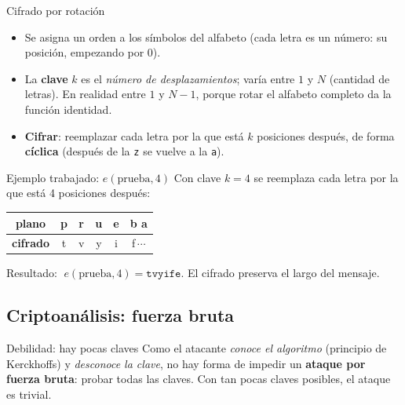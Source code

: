 \documentclass[11pt,a4paper]{article}
\begin{document}
\begin{defbox}{Cifrado por rotación}
\begin{itemize}[leftmargin=1.4em,itemsep=2pt]
  \item Se asigna un orden a los símbolos del alfabeto (cada letra es un número: su posición,
        empezando por 0).
  \item La \textbf{clave} $k$ es el \emph{número de desplazamientos}; varía entre $1$ y $N$
        (cantidad de letras). En realidad entre $1$ y $N-1$, porque rotar el alfabeto completo
        da la función identidad.
  \item \textbf{Cifrar}: reemplazar cada letra por la que está $k$ posiciones después, de
        forma \textbf{cíclica} (después de la \texttt{z} se vuelve a la \texttt{a}).
\end{itemize}
\end{defbox}

\begin{practbox}{Ejemplo trabajado: $e(\text{prueba},4)$}
Con clave $k=4$ se reemplaza cada letra por la que está 4 posiciones después:
\begin{center}
\renewcommand{\arraystretch}{1.2}
\begin{tabular}{cccccc}
\toprule
plano   & p & r & u & e & b a\\
\midrule
\textbf{cifrado} & t & v & y & i & f\,$\cdots$\\
\bottomrule
\end{tabular}
\end{center}
Resultado: $\;e(\text{prueba},4)=\texttt{tvyife}$. El cifrado preserva el largo del mensaje.
\end{practbox}

\subsection{Criptoanálisis: fuerza bruta}
\begin{warnbox}{Debilidad: hay pocas claves}
Como el atacante \emph{conoce el algoritmo} (principio de Kerckhoffs) y \emph{desconoce la
clave}, no hay forma de impedir un \textbf{ataque por fuerza bruta}: probar todas las claves.
Con tan pocas claves posibles, el ataque es trivial.
\end{warnbox}
\end{document}
